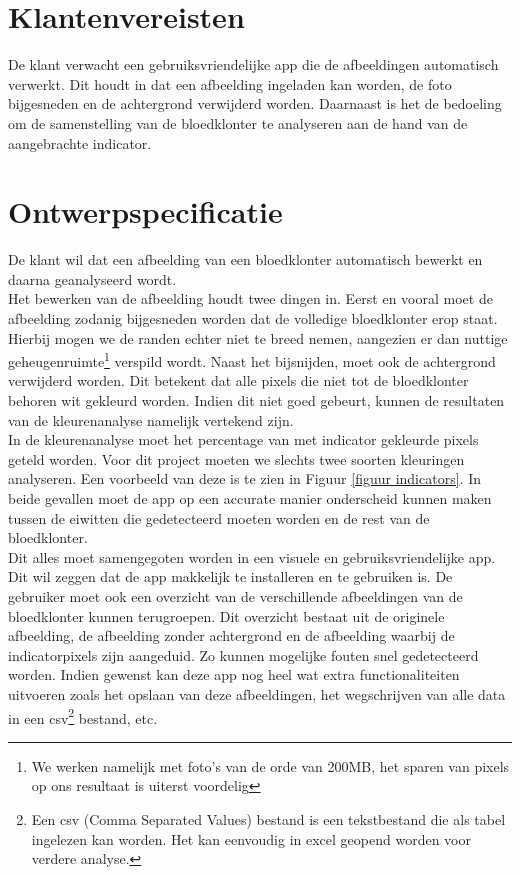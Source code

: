 \documentclass[a4paper,kulak]{kulakarticle}
\begin{document}
	\tableofcontents

	\newpage
		
	\section{Klantenvereisten}
		De klant verwacht een gebruiksvriendelijke app die de afbeeldingen automatisch verwerkt. Dit houdt in dat een afbeelding ingeladen kan worden, de foto bijgesneden en de achtergrond verwijderd worden. Daarnaast is het de bedoeling om de samenstelling van de bloedklonter te analyseren aan de hand van de aangebrachte indicator.
	
	\section{Ontwerpspecificatie}
		De klant wil dat een afbeelding van een bloedklonter automatisch bewerkt en daarna geanalyseerd wordt.\\
		Het bewerken van de afbeelding houdt twee dingen in. Eerst en vooral moet de afbeelding zodanig bijgesneden worden dat de volledige bloedklonter erop staat. Hierbij mogen we de randen echter niet te breed nemen, aangezien er dan nuttige geheugenruimte\footnote{We werken namelijk met foto's van de orde van 200MB, het sparen van pixels op ons resultaat is uiterst voordelig} verspild wordt. 
		Naast het bijsnijden, moet ook de achtergrond verwijderd worden. Dit betekent dat alle pixels die niet tot de bloedklonter behoren wit gekleurd worden. Indien dit niet goed gebeurt, kunnen de resultaten van de kleurenanalyse namelijk vertekend zijn.\\
		In de kleurenanalyse moet het percentage van met indicator gekleurde pixels geteld worden. Voor dit project moeten we slechts twee soorten kleuringen analyseren. Een voorbeeld van deze is te zien in Figuur \ref{figuur indicators}. In beide gevallen moet de app op een accurate manier onderscheid kunnen maken tussen de eiwitten die gedetecteerd moeten worden en de rest van de bloedklonter. \\
		Dit alles moet samengegoten worden in een visuele en gebruiksvriendelijke app. Dit wil zeggen dat de app makkelijk te installeren en te gebruiken is. De gebruiker moet ook een overzicht van de verschillende afbeeldingen van de bloedklonter kunnen terugroepen. Dit overzicht bestaat uit de originele afbeelding, de afbeelding zonder achtergrond en de afbeelding waarbij de indicatorpixels zijn aangeduid. Zo kunnen mogelijke fouten snel gedetecteerd worden. Indien gewenst kan deze app nog heel wat extra functionaliteiten uitvoeren zoals het opslaan van deze afbeeldingen, het wegschrijven van alle data in een csv\footnote{Een csv (Comma Separated Values) bestand is een tekstbestand die als tabel ingelezen kan worden. Het kan eenvoudig in excel geopend worden voor verdere analyse.} bestand, etc.
	
\end{document}
